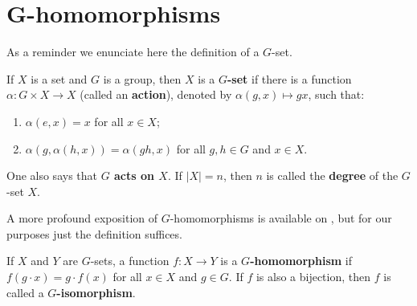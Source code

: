 \section{G-homomorphisms}

As a reminder we enunciate here the definition of a $G$-set.

\begin{definition}
    \cite[p.~55]{RotmanITG}
    If $X$ is a set and $G$ is a group, then $X$ is a \textbf{$G$-set} if there is a function $\alpha : G \times X \to X$ (called an \textbf{action}), denoted by $\alpha(g, x) \mapsto gx$, such that:
    \begin{enumerate}
    \item $\alpha(e, x) = x$ for all $x \in X$;
    \item $\alpha(g, \alpha(h, x)) = \alpha(gh, x)$ for all $g, h \in G$ and $x \in X$.
    \end{enumerate}
    One also says that \textbf{$G$ acts on $X$}. If $|X| = n$, then $n$ is called the \textbf{degree} of the $G$-set $X$.
\end{definition}
    

A more profound exposition of $G$-homomorphisms is available on \cite[p.~260]{RotmanITG}, but for our purposes just the definition suffices.

\begin{definition}
    If $X$ and $Y$ are $G$-sets, a function $f: X \rightarrow Y$ is a \textbf{$G$-homomorphism} if $f(g \cdot x) = g \cdot f(x)$ for all $x \in X$ and $g \in G$. If $f$ is also a bijection, then $f$ is called a \textbf{$G$-isomorphism}.

\end{definition}